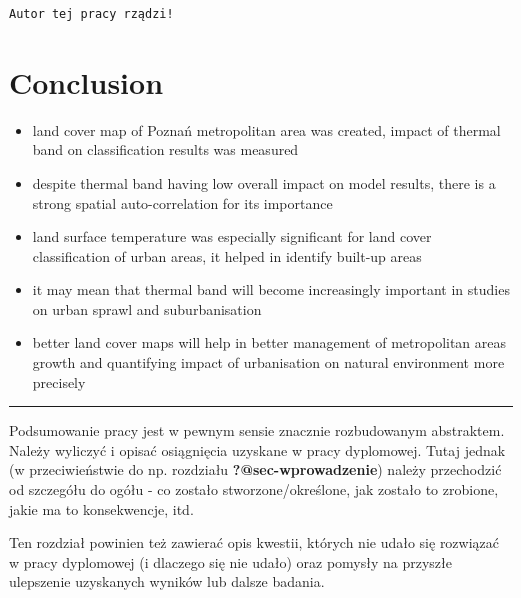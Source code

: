 \documentclass{amuthesis}
\begin{document}
\begin{verbatim}
Autor tej pracy rządzi!
\end{verbatim}


\hypertarget{conclusion}{%
\chapter{Conclusion}\label{conclusion}}

\begin{itemize}
\item
  land cover map of Poznań metropolitan area was created, impact of
  thermal band on classification results was measured
\item
  despite thermal band having low overall impact on model results, there
  is a strong spatial auto-correlation for its importance
\item
  land surface temperature was especially significant for land cover
  classification of urban areas, it helped in identify built-up areas
\item
  it may mean that thermal band will become increasingly important in
  studies on urban sprawl and suburbanisation
\item
  better land cover maps will help in better management of metropolitan
  areas growth and quantifying impact of urbanisation on natural
  environment more precisely
\end{itemize}

\begin{center}\rule{0.5\linewidth}{0.5pt}\end{center}

Podsumowanie pracy jest w pewnym sensie znacznie rozbudowanym
abstraktem. Należy wyliczyć i opisać osiągnięcia uzyskane w pracy
dyplomowej. Tutaj jednak (w przeciwieństwie do np. rozdziału
\textbf{?@sec-wprowadzenie}) należy przechodzić od szczegółu do ogółu -
co zostało stworzone/określone, jak zostało to zrobione, jakie ma to
konsekwencje, itd.

Ten rozdział powinien też zawierać opis kwestii, których nie udało się
rozwiązać w pracy dyplomowej (i dlaczego się nie udało) oraz pomysły na
przyszłe ulepszenie uzyskanych wyników lub dalsze badania.

\printbibliography[heading=bibintoc, title=Bibliografia]
\end{document}
